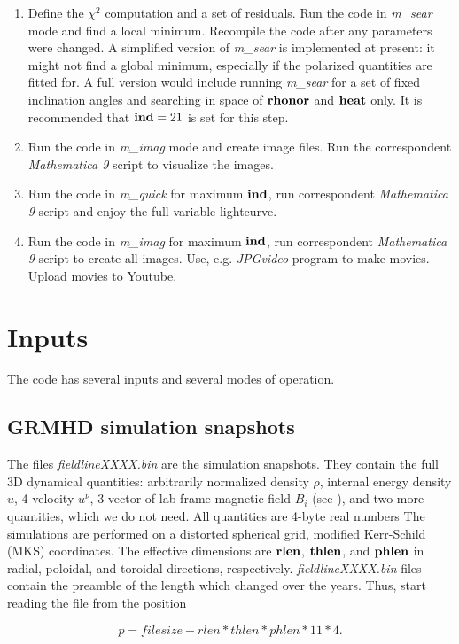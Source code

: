 \documentclass{emulateapj}
\newcommand{\mat}{\textit{Mathematica 9 }}
\begin{document}
\begin{enumerate}
{  in order to produce a spectrum, which resembles the observed
  spectrum.}
\item{Define the $\chi^2$ computation and a set of residuals.  Run the
  code in \textit{m\_sear} mode and find a local minimum. Recompile
  the code after any parameters were changed.  A simplified version of
  \textit{m\_sear} is implemented at present: it might not find a
  global minimum, especially if the polarized quantities are fitted
  for.  A full version would include running \textit{m\_sear} for a
  set of fixed inclination angles and searching in space of $\bf
  rhonor$ and $\bf heat$ only.  It is recommended that ${\bf ind}=21$
  is set for this step.}
\item{Run the code in \textit{m\_imag} mode and create image
  files. Run the correspondent \mat script to visualize the images.}
\item{Run the code in \textit{m\_quick} for maximum $\bf ind$, run
  correspondent \mat script and enjoy the full variable lightcurve.}
\item{Run the code in \textit{m\_imag} for maximum $\bf ind$, run
  correspondent \mat script to create all images. Use,
  e.g. \textit{JPGvideo} program to make movies.  Upload movies to
  Youtube.}
\end{enumerate}

\section{Inputs}
The code has several inputs and several modes of operation.
\subsection{GRMHD simulation snapshots}
The files \textit{fieldlineXXXX.bin} are the simulation
snapshots. They contain the full 3D dynamical quantities: arbitrarily
normalized density $\rho$, internal energy density $u$, 4-velocity
$u^\nu$, 3-vector of lab-frame magnetic field $B_i$ (see
\citealt{Penna:2010dj}), and two more quantities, which we do not
need. All quantities are 4-byte real numbers The simulations are
performed on a distorted spherical grid, modified Kerr-Schild (MKS)
coordinates. The effective dimensions are ${\bf rlen}$, ${\bf thlen}$,
and ${\bf phlen}$ in radial, poloidal, and toroidal directions,
respectively. \textit{fieldlineXXXX.bin} files contain the preamble of
the length which changed over the years.  Thus, start reading the file
from the position

\begin{equation}
p=filesize-rlen*thlen*phlen*11*4.
\end{equation}
\end{document}
